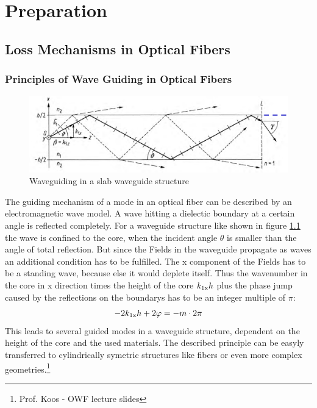 \chapter{Preparation}
\section{Loss Mechanisms in Optical Fibers}

\subsection{Principles of Wave Guiding in Optical Fibers}

\begin{figure}%
\centering
\includegraphics[width=.75\columnwidth]{grafiken/slab1.png}%
\caption{Waveguiding in a slab waveguide structure}%
\label{fig:slab1}%
\end{figure}

The guiding mechanism of a mode in an optical fiber can be described by an electromagnetic wave model. A wave hitting a dielectic boundary at a certain angle is reflected completely. For a waveguide structure like shown in figure \ref{fig:slab1} the wave is confined to the core, when the incident angle $\theta$ is smaller than the angle of total reflection. But since the Fields in the waveguide propagate as waves an additional condition has to be fulfilled. The x component of the Fields has to be a standing wave, because else it would deplete itself. Thus the wavenumber in the core in x direction times the height of the core $k_{\mathrm{1x}}h$ plus the phase jump caused by the reflections on the boundarys has to be an integer multiple of $\pi$:
\begin{equation}
 -2k_{\mathrm{1x}}h+2\varphi = -m\cdot2\pi
\end{equation}
This leads to several guided modes in a waveguide structure, dependent on the height of the core and the used materials. The described principle can be easyly transferred to cylindrically symetric structures like fibers or even more complex geometries.\footnote[1]{Prof. Koos - OWF lecture slides}

